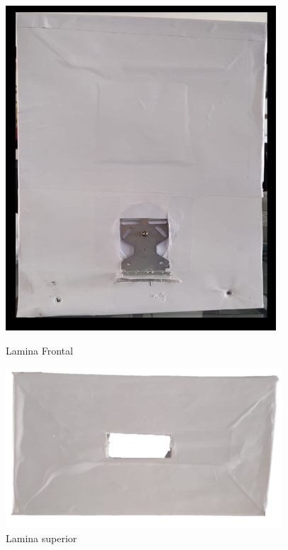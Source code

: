 \begin{figure}[ht]
	\centering
	\begin{minipage}[b]{0.25\linewidth}
		\centering
		\includegraphics[width=\linewidth]{Figs/300.png}
		\caption{Lamina Frontal}
		\label{fig:frontal}
	\end{minipage}
	\hspace{2.5cm}
	\begin{minipage}[b]{0.25\linewidth}
		\centering
		\includegraphics[width=\linewidth]{Figs/301.png}
		\caption{Lamina superior}
		\label{fig:superior}
	\end{minipage}
\end{figure}

